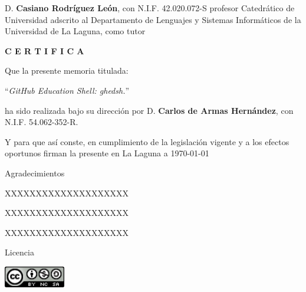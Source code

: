 \documentclass[spanish,a4paper,14pt,oneside]{extreport}
\begin{document}
D. {\bf Casiano Rodríguez León}, con N.I.F. 42.020.072-S profesor Catedrático de Universidad adscrito al Departamento de Lenguajes y Sistemas Informáticos de la Universidad de La Laguna, como tutor


\bigskip
\bigskip
{\bf C E R T I F I C A }

\bigskip
\bigskip
\bigskip
Que la presente memoria titulada:

\bigskip
``{\it GitHub Education Shell: ghedsh.}''

\bigskip
\bigskip
\bigskip

\noindent ha sido realizada bajo su dirección por D. {\bf Carlos de Armas Hernández},
con N.I.F. 54.062-352-R.

\bigskip
\bigskip

Y para que así conste, en cumplimiento de la legislación vigente y a los efectos
oportunos firman la presente en La Laguna a \today

\newpage
\thispagestyle{empty}

{ \flushright

\begin{LARGE}
Agradecimientos
\end{LARGE}

\hspace{3mm}

\begin{large}


\hspace{3mm}
XXXXXXXXXXXXXXXXXXXX
\bigskip

\hspace{3mm}
XXXXXXXXXXXXXXXXXXXX
\bigskip

\hspace{3mm}
XXXXXXXXXXXXXXXXXXXX

\end{large}

}

\newpage

\begin{huge}
Licencia
\end{huge}

\bigskip
\bigskip
\begin{center}
	\includegraphics[width=0.2\textwidth]{images/by-nc-sa_88x31}
\end{center}
\end{document}

